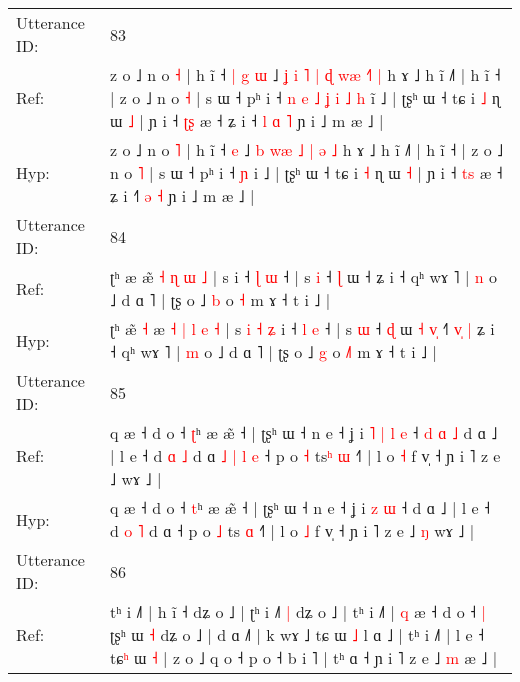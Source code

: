 \documentclass[10pt]{article}
\DeclareRobustCommand{\hl}[1]{{\textcolor{red}{#1}}}
\begin{document}
\begin{longtable}{ll}
 \\
\midrule
Utterance ID: & 83 \\
Ref: & z o ˩ n o \hl{˧} | h ĩ ˧\hl{ }\hl{|}\hl{ }\hl{g} \hl{ɯ} ˩\hl{ }\hl{ʝ} \hl{i} \hl{˥}\hl{ }\hl{|} \hl{ɖ} \hl{w}\hl{æ} \hl{˧}\hl{˥} \hl{|} h ɤ ˩ h ĩ ˩˥ | h ĩ ˧ | z o ˩ n o \hl{˧} | s ɯ ˧ pʰ i ˧\hl{ }\hl{n}\hl{ }\hl{e}\hl{ }\hl{˩}\hl{ }\hl{ʝ}\hl{ }\hl{i}\hl{ }\hl{˩} \hl{h} i\hl{̃} ˩ | ʈʂʰ ɯ ˧ tɕ i \hl{˩} ɳ ɯ \hl{˩} | ɲ i ˧ \hl{ʈ}\hl{ʂ} æ ˧ ʑ i ˧\hl{ }\hl{l} \hl{ɑ} \hl{˥} ɲ i ˩ m æ ˩ |
 \\
Hyp: & z o ˩ n o \hl{˥} | h ĩ ˧\hl{}\hl{}\hl{}\hl{} \hl{e} ˩\hl{}\hl{} \hl{b} \hl{}\hl{w}\hl{æ} \hl{˩} \hl{}\hl{|} \hl{}\hl{ə} \hl{˩} h ɤ ˩ h ĩ ˩˥ | h ĩ ˧ | z o ˩ n o \hl{˥} | s ɯ ˧ pʰ i ˧\hl{}\hl{}\hl{}\hl{}\hl{}\hl{}\hl{}\hl{}\hl{}\hl{}\hl{}\hl{} \hl{ɲ} i\hl{} ˩ | ʈʂʰ ɯ ˧ tɕ i \hl{˧} ɳ ɯ \hl{˧} | ɲ i ˧ \hl{t}\hl{s} æ ˧ ʑ i ˧\hl{}\hl{˥} \hl{ə} \hl{˧} ɲ i ˩ m æ ˩ |
 \\
\midrule
Utterance ID: & 84 \\
Ref: & ʈʰ æ\hl{}\hl{}\hl{} æ\hl{}\hl{̃} \hl{˧} \hl{ɳ} \hl{ɯ} \hl{˩} | s\hl{}\hl{}\hl{}\hl{}\hl{}\hl{} i ˧ \hl{ɭ} \hl{ɯ} ˧ | s \hl{i} ˧ \hl{ɭ} ɯ\hl{}\hl{}\hl{}\hl{}\hl{} ˧\hl{}\hl{}\hl{}\hl{}\hl{}\hl{} ʑ i ˧ qʰ wɤ ˥ | \hl{n} o ˩ d ɑ ˥ | ʈʂ o ˩ \hl{b} o \hl{}\hl{˧} m ɤ ˧ t i ˩ |
 \\
Hyp: & ʈʰ æ\hl{̃}\hl{ }\hl{˧} æ\hl{ }\hl{˧} \hl{|} \hl{l} \hl{e} \hl{˧} | s\hl{ }\hl{i}\hl{ }\hl{˧}\hl{ }\hl{ʑ} i ˧ \hl{l} \hl{e} ˧ | s \hl{ɯ} ˧ \hl{ɖ} ɯ\hl{ }\hl{˧}\hl{ }\hl{v}\hl{̩} ˧\hl{˥}\hl{ }\hl{v}\hl{̩}\hl{ }\hl{|} ʑ i ˧ qʰ wɤ ˥ | \hl{m} o ˩ d ɑ ˥ | ʈʂ o ˩ \hl{g} o \hl{˩}\hl{˥} m ɤ ˧ t i ˩ |
 \\
\midrule
Utterance ID: & 85 \\
Ref: & q æ ˧ d o ˧ \hl{ʈ}ʰ æ æ̃ ˧ | ʈʂʰ ɯ ˧ n e ˧ ʝ i\hl{ }\hl{˥}\hl{ }\hl{|} \hl{l} \hl{e} ˧\hl{ }\hl{d}\hl{ }\hl{ɑ}\hl{ }\hl{˩} d ɑ ˩ | l e ˧ d \hl{ɑ} \hl{˩} d ɑ\hl{ }\hl{˩}\hl{ }\hl{|}\hl{ }\hl{l}\hl{ }\hl{e} ˧ p o \hl{˧} ts\hl{ʰ} \hl{ɯ} ˧˥ | l o \hl{˧} f v̩ ˧ ɲ i ˥ z e ˩\hl{}\hl{} wɤ ˩ |
 \\
Hyp: & q æ ˧ d o ˧ \hl{t}ʰ æ æ̃ ˧ | ʈʂʰ ɯ ˧ n e ˧ ʝ i\hl{}\hl{}\hl{}\hl{} \hl{z} \hl{ɯ} ˧\hl{}\hl{}\hl{}\hl{}\hl{}\hl{} d ɑ ˩ | l e ˧ d \hl{o} \hl{˥} d ɑ\hl{}\hl{}\hl{}\hl{}\hl{}\hl{}\hl{}\hl{} ˧ p o \hl{˩} ts\hl{} \hl{ɑ} ˧˥ | l o \hl{˩} f v̩ ˧ ɲ i ˥ z e ˩\hl{ }\hl{ŋ} wɤ ˩ |
 \\
\midrule
Utterance ID: & 86 \\
Ref: & tʰ i ˩˥ | h ĩ ˧ dʑ o ˩ | ʈʰ i ˩\hl{˥}\hl{ }\hl{|} dʑ o ˩ | tʰ i ˩˥ | \hl{q} æ ˧ d o ˧\hl{ }\hl{|} ʈʂʰ ɯ \hl{˧} dʑ o ˩ | d ɑ ˩˥ | k wɤ ˩ tɕ ɯ \hl{˩} l ɑ ˩ | tʰ i ˩˥ | l e ˧ tɕ\hl{ʰ} ɯ \hl{˧} | z o ˩\hl{}\hl{} q o ˧ p o ˧ b i ˥ | tʰ ɑ ˧ ɲ i ˥ z e ˩\hl{ }\hl{m} æ ˩ |

\end{longtable}
\end{document}
